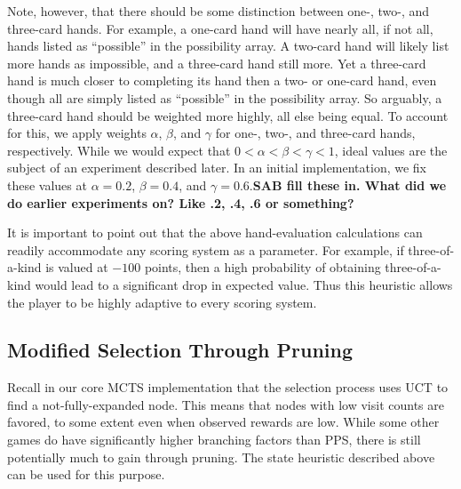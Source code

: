 \documentclass[letterpaper]{article}
\begin{document}
Note, however, that there should be some distinction between one-, two-, and three-card hands. For example, a one-card hand will have nearly all, if not all, hands listed as ``possible'' in the possibility array. A two-card hand will likely list more hands as impossible, and a three-card hand still more. Yet a three-card hand is much closer to completing its hand then a two- or one-card hand, even though all are simply listed as ``possible'' in the possibility array. So arguably, a three-card hand should be weighted more highly, all else being equal. To account for this, we apply weights $\alpha$, $\beta$, and $\gamma$ for one-, two-, and three-card hands, respectively. While we would expect that $0 < \alpha < \beta < \gamma < 1$, ideal values are the subject of an experiment described later. In an initial implementation, we fix these values at $\alpha = 0.2$, $\beta = 0.4$, and $\gamma = 0.6$.{\bf SAB fill these in. What did we do earlier experiments on? Like .2, .4, .6 or something?}


It is important to point out that the above hand-evaluation calculations can readily accommodate any scoring system as a parameter. For example, if three-of-a-kind is valued at $-100$ points, then a high probability of obtaining three-of-a-kind would lead to a significant drop in expected value. Thus this heuristic allows the player to be highly adaptive to every scoring system.

\subsection{Modified Selection Through Pruning}

Recall in our core MCTS implementation that the selection process uses UCT to find a not-fully-expanded node. This means that nodes with low visit counts are favored, to some extent even when observed rewards are low. While some other games do have significantly higher branching factors than PPS, there is still potentially much to gain through pruning. The state heuristic described above can be used for this purpose.
\end{document}
